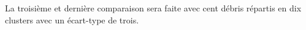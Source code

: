 La troisième et dernière comparaison sera faite avec cent débris répartis en dix clusters
avec un écart-type de trois.